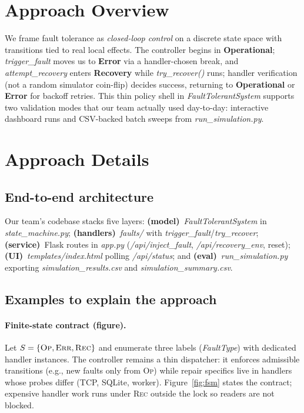 \documentclass[sigconf,authorversion,nonacm]{acmart}
\begin{document}
\section{Approach Overview}
\label{sec:overview}
We frame fault tolerance as \emph{closed-loop control} on a discrete state space with transitions tied to real local effects. The controller begins in \textbf{Operational}; \emph{trigger\_fault} moves us to \textbf{Error} via a handler-chosen break, and \emph{attempt\_recovery} enters \textbf{Recovery} while \emph{try\_recover()} runs; handler verification (not a random simulator coin-flip) decides success, returning to \textbf{Operational} or \textbf{Error} for backoff retries. This thin policy shell in \emph{FaultTolerantSystem} supports two validation modes that our team actually used day-to-day: interactive dashboard runs and CSV-backed batch sweeps from \emph{run\_simulation.py}.

\section{Approach Details}
\label{sec:details}

\subsection{End-to-end architecture}
Our team's codebase stacks five layers: \textbf{(model)}~\emph{FaultTolerantSystem} in \emph{state\_machine.py}; \textbf{(handlers)}~\emph{faults/} with \emph{trigger\_fault}/\emph{try\_recover}; \textbf{(service)}~Flask routes in \emph{app.py} (\emph{/api/inject\_fault}, \emph{/api/recovery\_env}, reset); \textbf{(UI)}~\emph{templates/index.html} polling \emph{/api/status}; and \textbf{(eval)}~\emph{run\_simulation.py} exporting \emph{simulation\_results.csv} and \emph{simulation\_summary.csv}.

\subsection{Examples to explain the approach}

\paragraph{Finite-state contract (figure).}
Let $S=\{\textsc{Op},\textsc{Err},\textsc{Rec}\}$ and enumerate three labels (\emph{FaultType}) with dedicated handler instances. The controller remains a thin dispatcher: it enforces admissible transitions (e.g., new faults only from \textsc{Op}) while repair specifics live in handlers whose probes differ (TCP, SQLite, worker). Figure~\ref{fig:fsm} states the contract; expensive handler work runs under \textsc{Rec} outside the lock so readers are not blocked.
\end{document}
